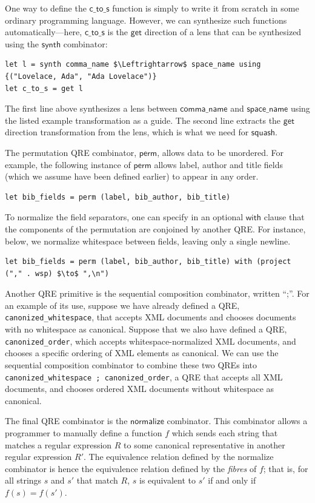 \documentclass[acmsmall,review,anonymous]{acmart}
\newcommand{\codefont}[1]{\ensuremath{\mathsf{#1}}}
\newcommand{\kw}[1]{\codefont{#1}}
\begin{document}
One way to define the \codefont{c\_to\_s} function
is simply to write it from scratch in some ordinary programming language.
However, we can synthesize such functions automatically---here, \codefont{c\_to\_s} is the
\codefont{get} direction of a lens that can be synthesized using the 
\kw{synth} combinator:
%
\begin{lstlisting}
let l = synth comma_name $\Leftrightarrow$ space_name using {("Lovelace, Ada", "Ada Lovelace")}
let c_to_s = get l
\end{lstlisting}
\noindent
The first line above synthesizes a lens between \codefont{comma\_name} and
\codefont{space\_name} using the listed example transformation as a guide.  The
second line extracts the \codefont{get} direction transformation from the lens,
which is what we need for \kw{squash}.

The permutation QRE combinator, \kw{perm}, allows data to be unordered. For example,
the following instance of \kw{perm} allows label, author and title fields
(which we assume have been defined earlier) to appear in any order.
%
\begin{lstlisting}
let bib_fields = perm (label, bib_author, bib_title)
\end{lstlisting}
%
To normalize the field separators, one can specify 
in an optional \kw{with} clause that the components of the
permutation are conjoined by another QRE. For instance, below, we normalize
whitespace between fields, leaving only a single newline.
%
\begin{lstlisting}
let bib_fields = perm (label, bib_author, bib_title) with (project ("," . wsp) $\to$ ",\n")
\end{lstlisting}

Another QRE primitive is the sequential composition combinator, written ``;''.
For an example of its use, suppose we have already defined a QRE,
\lstinline{canonized_whitespace}, that accepts XML documents and chooses
documents with no whitespace as canonical. Suppose that we also have defined a
QRE, \lstinline{canonized_order}, which accepts whitespace-normalized XML
documents, and chooses a specific ordering of XML elements as canonical. We can
use the sequential composition combinator to combine these two QREs into
\lstinline{canonized_whitespace ; canonized_order}, a QRE that accepts all XML
documents, and chooses ordered XML documents without whitespace as canonical.

The final QRE combinator is the \kw{normalize} combinator. This combinator
allows a programmer to manually define a function $f$ which sends each
string that matches a regular expression $R$ to some canonical
representative in another regular expression $R'$. The equivalence
relation defined by the normalize combinator is hence the equivalence
relation defined by the {\em fibres} of $f$; that is, for all strings
$s$ and $s'$ that match $R$, $s$ is equivalent to $s'$ if and only if
$f(s) = f(s')$.
\end{document}
